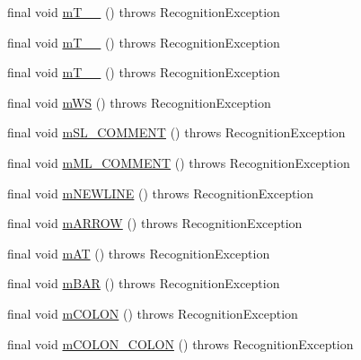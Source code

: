 \begin{DoxyCompactItemize}
\item 
final void \hyperlink{classorg_1_1tzi_1_1use_1_1parser_1_1generator_1_1_generator_lexer_a32f0e16d92dd5e7894bed55f8f3153a8}{m\-T\-\_\-\-\_} ()  throws Recognition\-Exception 
\item 
final void \hyperlink{classorg_1_1tzi_1_1use_1_1parser_1_1generator_1_1_generator_lexer_a47d25ab776710386b0ba81e43b63e0dc}{m\-T\-\_\-\-\_} ()  throws Recognition\-Exception 
\item 
final void \hyperlink{classorg_1_1tzi_1_1use_1_1parser_1_1generator_1_1_generator_lexer_aa6b735a3cbd8dc7d41d6b6374f659d26}{m\-T\-\_\-\-\_} ()  throws Recognition\-Exception 
\item 
final void \hyperlink{classorg_1_1tzi_1_1use_1_1parser_1_1generator_1_1_generator_lexer_a6d2e589ea3b0ae8babed90600fcb23af}{m\-W\-S} ()  throws Recognition\-Exception 
\item 
final void \hyperlink{classorg_1_1tzi_1_1use_1_1parser_1_1generator_1_1_generator_lexer_a68550cbda5c1d059ea05696462fac26a}{m\-S\-L\-\_\-\-C\-O\-M\-M\-E\-N\-T} ()  throws Recognition\-Exception 
\item 
final void \hyperlink{classorg_1_1tzi_1_1use_1_1parser_1_1generator_1_1_generator_lexer_a86afce322bedbf6f3863b1b9902f2d17}{m\-M\-L\-\_\-\-C\-O\-M\-M\-E\-N\-T} ()  throws Recognition\-Exception 
\item 
final void \hyperlink{classorg_1_1tzi_1_1use_1_1parser_1_1generator_1_1_generator_lexer_a1847a40a232070cfdb9a123e1b525183}{m\-N\-E\-W\-L\-I\-N\-E} ()  throws Recognition\-Exception 
\item 
final void \hyperlink{classorg_1_1tzi_1_1use_1_1parser_1_1generator_1_1_generator_lexer_a4b39d784861cc0bfbf8cb595f9672e9d}{m\-A\-R\-R\-O\-W} ()  throws Recognition\-Exception 
\item 
final void \hyperlink{classorg_1_1tzi_1_1use_1_1parser_1_1generator_1_1_generator_lexer_a8b7d479042966b1033ef433cb73338da}{m\-A\-T} ()  throws Recognition\-Exception 
\item 
final void \hyperlink{classorg_1_1tzi_1_1use_1_1parser_1_1generator_1_1_generator_lexer_ab181c6372e55562344c79606c87eade3}{m\-B\-A\-R} ()  throws Recognition\-Exception 
\item 
final void \hyperlink{classorg_1_1tzi_1_1use_1_1parser_1_1generator_1_1_generator_lexer_af5fc8c3990952c011849756b4da4f26e}{m\-C\-O\-L\-O\-N} ()  throws Recognition\-Exception 
\item 
final void \hyperlink{classorg_1_1tzi_1_1use_1_1parser_1_1generator_1_1_generator_lexer_a285f89d63e73650fdb1360a96fac6b1e}{m\-C\-O\-L\-O\-N\-\_\-\-C\-O\-L\-O\-N} ()  throws Recognition\-Exception 

\end{DoxyCompactItemize}
